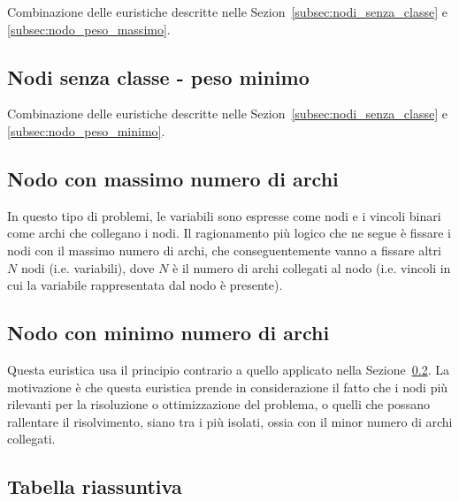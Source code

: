 Combinazione delle euristiche descritte nelle Sezion~\ref{subsec:nodi_senza_classe} e \ref{subsec:nodo_peso_massimo}.

\subsection{Nodi senza classe - peso minimo}

Combinazione delle euristiche descritte nelle Sezion~\ref{subsec:nodi_senza_classe} e \ref{subsec:nodo_peso_minimo}.

\subsection{Nodo con massimo numero di archi}\label{subsec:nodo_massimo_numero_archi}

In questo tipo di problemi, le variabili sono espresse come nodi e i vincoli binari come archi che collegano i nodi. Il ragionamento più logico che ne segue è fissare i nodi con il massimo numero di archi, che conseguentemente vanno a fissare altri $N$ nodi (i.e. variabili), dove $N$ è il numero di archi collegati al nodo (i.e. vincoli in cui la variabile rappresentata dal nodo è presente).

\subsection{Nodo con minimo numero di archi}

Questa euristica usa il principio contrario a quello applicato nella Sezione~\ref{subsec:nodo_massimo_numero_archi}. La motivazione è che questa euristica prende in considerazione il fatto che i nodi più rilevanti per la risoluzione o ottimizzazione del problema, o quelli che possano rallentare il risolvimento, siano tra i più isolati, ossia con il minor numero di archi collegati.

\subsection{Tabella riassuntiva}